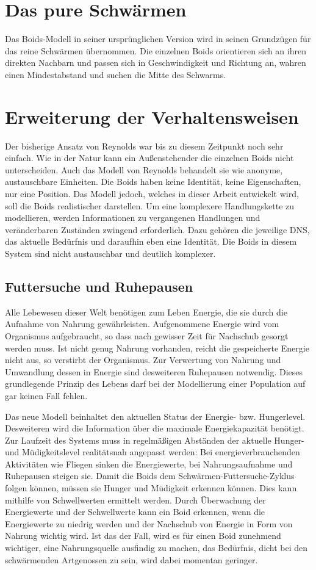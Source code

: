 \documentclass[draft=false
              ,paper=a4
              ,twoside=false
              ,fontsize=11pt
              ,headsepline
              ,BCOR10mm
              ,DIV11
              ,bibtotoc
              ,liststotoc
              ]{scrbook}
\begin{document}
\section{Das pure Schwärmen}
Das Boids-Modell in seiner ursprünglichen Version wird in seinen Grundzügen für das reine Schwärmen übernommen. Die einzelnen Boids orientieren sich an ihren direkten Nachbarn und passen sich in Geschwindigkeit und Richtung an, wahren einen Mindestabstand und suchen die Mitte des Schwarms.

\section{Erweiterung der Verhaltensweisen}
Der bisherige Ansatz von Reynolds war bis zu diesem Zeitpunkt noch sehr einfach. Wie in der Natur kann ein Außenstehender die einzelnen Boids nicht unterscheiden. Auch das Modell von Reynolds behandelt sie wie anonyme, austauschbare Einheiten. Die Boids haben keine Identität, keine Eigenschaften, nur eine Position. Das Modell jedoch, welches in dieser Arbeit entwickelt wird, soll die Boids realistischer darstellen. Um eine komplexere Handlungskette zu modellieren, werden Informationen zu vergangenen Handlungen und veränderbaren Zuständen zwingend erforderlich. Dazu gehören die jeweilige DNS, das aktuelle Bedürfnis und daraufhin eben eine Identität. Die Boids in diesem System sind nicht austauschbar und deutlich komplexer.
\subsection{Futtersuche und Ruhepausen}
Alle Lebewesen dieser Welt benötigen zum Leben Energie, die sie durch die Aufnahme von Nahrung gewährleisten. Aufgenommene Energie wird vom Organismus aufgebraucht, so dass nach gewisser Zeit für Nachschub gesorgt werden muss. Ist nicht genug Nahrung vorhanden, reicht die gespeicherte Energie nicht aus, so verstirbt der Organismus. Zur Verwertung von Nahrung und Umwandlung dessen in Energie sind desweiteren Ruhepausen notwendig. Dieses grundlegende Prinzip des Lebens darf bei der Modellierung einer Population auf gar keinen Fall fehlen.

Das neue Modell beinhaltet den aktuellen Status der Energie- bzw. Hungerlevel. Desweiteren wird die Information über die maximale Energiekapazität benötigt. Zur Laufzeit des Systems muss in regelmäßigen Abständen der aktuelle Hunger- und Müdigkeitslevel realitätsnah angepasst werden: Bei energieverbrauchenden Aktivitäten wie Fliegen sinken die Energiewerte, bei Nahrungsaufnahme und Ruhepausen steigen sie. Damit die Boids dem Schwärmen-Futtersuche-Zyklus folgen können, müssen sie Hunger und Müdigkeit erkennen können. Dies kann mithilfe von Schwellwerten ermittelt werden. Durch Überwachung der Energiewerte und der Schwellwerte kann ein Boid erkennen, wenn die Energiewerte zu niedrig werden und der Nachschub von Energie in Form von Nahrung wichtig wird. Ist das der Fall, wird es für einen Boid zunehmend wichtiger, eine Nahrungsquelle ausfindig zu machen, das Bedürfnis, dicht bei den schwärmenden Artgenossen zu sein, wird dabei momentan geringer.
\end{document}
